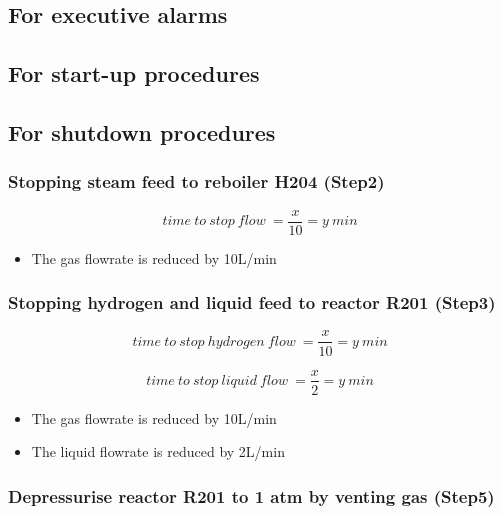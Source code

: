 \subsection{For executive alarms}

\subsection{For start-up procedures}

\subsection{For shutdown procedures}

\subsubsection{Stopping steam feed to reboiler H204 (Step2)}
    \begin{equation}
        time\:to\:stop\:flow\:=\frac{x}{10}=y\:min
    \end{equation}
    
    \begin{itemize}
        \item The gas flowrate is reduced by 10L/min
    \end{itemize}

\subsubsection{Stopping hydrogen and liquid feed to reactor R201 (Step3)}
    \begin{equation}
        time\:to\:stop\:hydrogen\:flow\:=\frac{x}{10}=y\:min
    \end{equation}
    
    \begin{equation}
        time\:to\:stop\:liquid\:flow\:=\frac{x}{2}=y\:min
    \end{equation}
    
    \begin{itemize}
        \item The gas flowrate is reduced by 10L/min
        \item The liquid flowrate is reduced by 2L/min
    \end{itemize}
 
 \subsubsection{Depressurise reactor R201 to 1 atm by venting gas (Step5)}   

